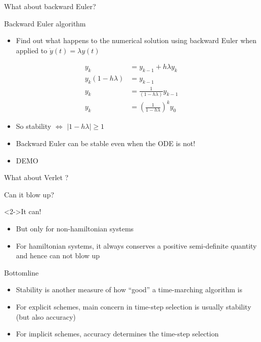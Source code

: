 \documentclass[presentation]{beamer}
\newcommand{\abs}[1]{\left\lvert#1\right\rvert}
\begin{document}
\begin{frame}[label={sec:orgca2cd02}]{What about backward Euler?}
\begin{block}{Backward Euler algorithm}
\begin{itemize}
\item Find out what happens to the numerical solution using backward Euler when applied to
\(\dot{y}(t) = \lambda y(t)\)
\end{itemize}
\begin{equation*}
\begin{aligned} y_k & = y_{k-1} + h \lambda y_{k} \\
y_k (1 - h \lambda) &= y_{k-1} \\
y_k &= \frac{1}{(1 - h \lambda)}y_{k-1} \\
y_k &= \left( \frac{1}{1 - h \lambda} \right)^k y_{0}
\end{aligned}
\end{equation*}
\begin{itemize}
\item So stability \(\Leftrightarrow\) \(\abs{1 - h \lambda} \geq 1\)
\item Backward Euler can be stable even when the ODE is not!
\item \alert{DEMO}
\end{itemize}
\end{block}
\end{frame}
\begin{frame}[label={sec:org9c07273}]{What about Verlet ?}
\begin{block}{Can it blow up?}
\end{block}
\begin{block}<2->{It can!}
\begin{itemize}
\item But only for non-hamiltonian systems
\item For hamiltonian systems, it always conserves a positive semi-definite
quantity and hence can not blow up
\end{itemize}
\end{block}
\end{frame}
\begin{frame}[label={sec:org230fff4}]{Bottomline}
\begin{itemize}
\item Stability is another measure of how ``good'' a time-marching algorithm is
\item For \alert{explicit} schemes, main concern in time-step selection is usually
\alert{stability} (but also accuracy)
\item For \alert{implicit} schemes, \alert{accuracy} determines the time-step selection
\end{itemize}
\end{frame}
\end{document}
